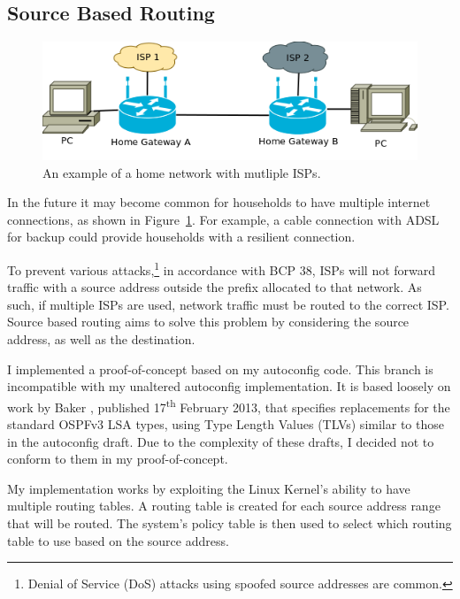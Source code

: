 \documentclass[12pt,a4paper,twoside]{report}
\begin{document}
\subsection{Source Based Routing}
\label{SourceBasedRouting}
\begin{figure}
\begin{center}
	\includegraphics[width=\linewidth]{../Diagrams/Network/MultipleISP.png}
	\caption{An example of a home network with mutliple ISPs.}\label{fig:MultipleISP}
\end{center}
\end{figure}
In the future it may become common for households to have multiple internet
connections, as shown in Figure~\ref{fig:MultipleISP}. For example, a cable
connection with ADSL for backup could provide households with a resilient
connection. 

To prevent various attacks,\footnote{Denial of Service
(DoS) attacks using spoofed source
addresses are common.} in accordance with BCP 38\cite{bcp38}, ISPs will not
forward traffic with a source address outside the prefix allocated to that
network. As such, if multiple ISPs are used, network traffic must be routed to
the correct ISP\@. Source based routing aims to solve this problem by considering
the source address, as well as the destination. 

I implemented a proof-of-concept based on my autoconfig code. This branch is
incompatible with my unaltered autoconfig implementation. It is based loosely
on work by Baker \cite{draft-baker-ipv6-ospf-extensible-00}
\cite{draft-baker-ipv6-ospf-dst-src-routing-00}, published
17\textsuperscript{th} February 2013, that specifies replacements for the
standard OSPFv3 LSA types, using Type Length Values (TLVs) similar to those in
the autoconfig draft. Due to the complexity of these drafts, I decided not to
conform to them in my proof-of-concept.

My implementation works by exploiting the Linux Kernel's ability to have
multiple routing tables. A routing table is created for each source address
range that will be routed. The system's policy table is then used to select
which routing table to use based on the source address.  
\end{document}
